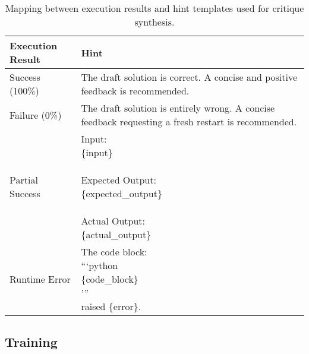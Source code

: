 \begin{table}[t!]
\centering
\small
{} %
\caption{Mapping between execution results and hint templates used for critique synthesis.}
\label{tab:hint}
\vspace{3mm}
\begin{tabular}{p{2.3cm}p{5cm}}
\toprule
Execution Result      & Hint                                                                                                                                  \\
\midrule
Success (100\%)             & The draft solution is correct. A concise and positive feedback is recommended.                                                        \\
Failure (0\%) & The draft solution is entirely wrong. A concise feedback requesting a fresh restart is recommended.               \\
Partial Success            & \parbox{5cm}{Input:\\
                         \{input\}\\
                         \\
                         Expected Output:\\
                         \{expected\_output\}\\
                         \\
                         Actual Output:\\
                         \{actual\_output\}} \\
Runtime Error  & \parbox{5cm}{The code block:\\
                         ```python\\
                         \{code\_block\}\\
                         '''\\
                         raised \{error\}.}                             \\
\bottomrule
\end{tabular}
\end{table}

\subsection{Training}\label{appendix:training_details}

